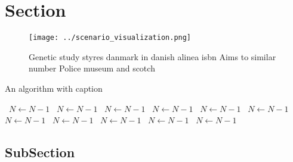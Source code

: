 \documentclass[a4paper]{article}
\begin{document}
\section{Section}

\begin{figure}
\centering
\texttt{[image: ../scenario\_visualization.png]}
\caption{Genetic study styres danmark in danish alinea isbn Aims to similar number Police museum and scotch 
}
\end{figure}
 
\begin{algorithm}
\caption{An algorithm with caption}
\begin{algorithmic}
\    \State $N \gets N - 1$
\    \State $N \gets N - 1$
\    \State $N \gets N - 1$
\    \State $N \gets N - 1$
\    \State $N \gets N - 1$
\    \State $N \gets N - 1$
\    \State $N \gets N - 1$
\    \State $N \gets N - 1$
\    \State $N \gets N - 1$
\    \State $N \gets N - 1$
\    \State $N \gets N - 1$
\EndWhile
\end{algorithmic}
\end{algorithm}

\subsection{SubSection}
\end{document}
